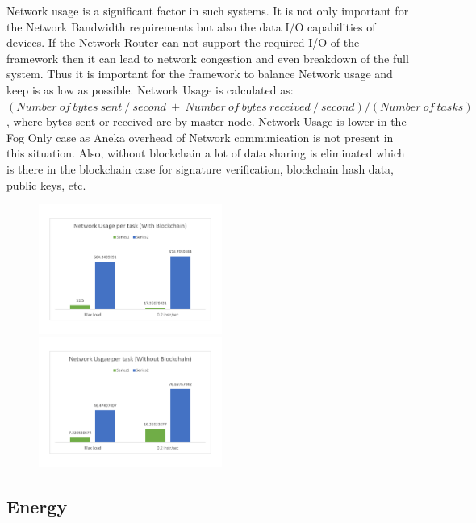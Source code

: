 \documentclass[10pt,journal,compsoc]{IEEEtran}
\begin{document}
Network usage is a significant factor in such systems. It is not only important for the Network Bandwidth requirements but also the data I/O capabilities of devices. If the Network Router can not support the required I/O of the framework then it can lead to network congestion and even breakdown of the full system. Thus it is important for the framework to balance Network usage and keep is as low as possible. Network Usage is calculated as: $(Number\ of\ bytes\ sent\ /\ second\ +\ Number\ of\ bytes\ received\ /\ second)/(Number\ of\ tasks)$, where bytes sent or received are by master node. Network Usage is lower in the Fog Only case as Aneka overhead of Network communication is not present in this situation. Also, without blockchain a lot of data sharing is eliminated which is there in the blockchain case for signature verification, blockchain hash data, public keys, etc.
\begin{figure}[h]
\centering
\includegraphics[width=6cm]{g61} \ \ \ \ \ \ \ \ \ \ \       
\includegraphics[width=6cm]{g62}
\end{figure}

\subsection{Energy}
\end{document}
